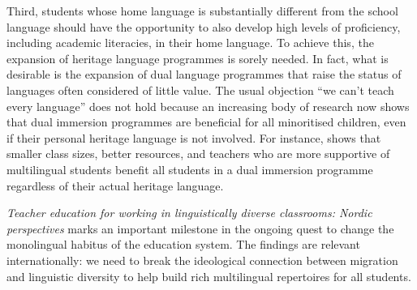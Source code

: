 \documentclass[output=paper]{langscibook}
\begin{document}
Third, students whose home language is substantially different from the school language should have the opportunity to also develop high levels of proficiency, including academic literacies, in their home language. To achieve this, the expansion of heritage language programmes is sorely needed. In fact, what is desirable is the expansion of dual language programmes that raise the status of languages often considered of little value. The usual objection “we can’t teach every language” does not hold because an increasing body of research now shows that dual immersion programmes are beneficial for all minoritised children, even if their personal heritage language is not involved. For instance, \citet{Purkarthofer2021} shows that smaller class sizes, better resources, and teachers who are more supportive of multilingual students benefit all students in a dual immersion programme regardless of their actual heritage language.

\textit{Teacher education for working in linguistically diverse classrooms: Nordic perspectives} marks an important milestone in the ongoing quest to change the monolingual habitus of the education system. The findings are relevant internationally: we need to break the ideological connection between migration and linguistic diversity to help build rich multilingual repertoires for all students.

\sloppy\printbibliography[heading=subbibliography,notkeyword=this]
\end{document}
